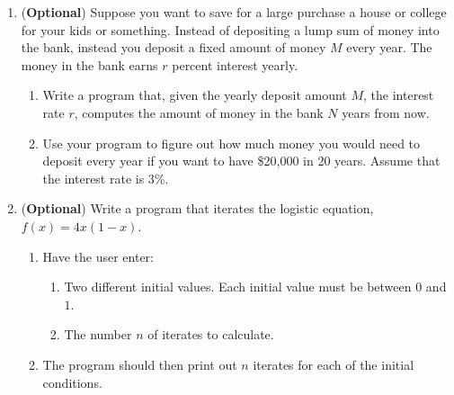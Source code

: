 \documentclass[12pt]{article}
\begin{document}
\begin{enumerate}
\item ({\bf Optional})  Suppose you want to save for a large purchase
  a house or college for your kids or something.  Instead of
  depositing a lump sum of money into the bank, instead you deposit a
  fixed amount of money $M$ every year.  The money in the bank earns
  $r$ percent interest yearly.  
\begin{enumerate}
\setlength{\itemsep}{-1mm}
  \item Write a program that, given the yearly deposit amount $M$, the
    interest rate $r$, computes the amount of money in the bank $N$
    years from now.   
  \item Use your program to figure out how much money you would need
    to deposit every year if you want to have \$20,000 in 20 years.
    Assume that the interest rate is $3$\%. \\
\end{enumerate}


\item ({\bf Optional})  Write a program that iterates the logistic
  equation, $f(x) = 4x(1-x)$.  
\begin{enumerate}
\setlength{\itemsep}{-1mm}
  \item Have the user enter:
\begin{enumerate}
\setlength{\itemsep}{-1mm}
  \item Two different initial values.  Each initial value must be
    between $0$ and $1$.
  \item The number $n$ of iterates to calculate.
\end{enumerate}
  \item The program should then print out $n$ iterates for each of the
    initial conditions.
\end{enumerate}




\end{enumerate}


 
\end{document}
